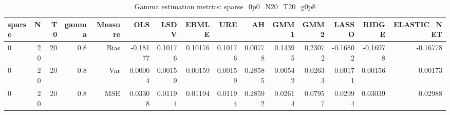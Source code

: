 \begin{table}[!htbp]\centering
\caption{Gamma estimation metrics: sparse_0p0_N20_T20_g0p8}
\label{tab:table1_sparse_0p0_N20_T20_g0p8}
\begin{tabular}{lrrrrrrrrrrrrrr}
\hline
sparse & N & T0 & gamma & Measure & OLS & LSDV & EBMLE & URE & AH & GMM1 & GMM2 & LASSO & RIDGE & ELASTIC_NET \\
\hline
0 & 20 & 20 & 0.8 & Bias & -0.18177 & 0.10176 & 0.10176 & 0.10176 & 0.00778 & 0.14395 & 0.23072 & -0.16802 & -0.16978 & -0.16778 \\
0 & 20 & 20 & 0.8 & Var & 0.00004 & 0.00159 & 0.00159 & 0.00159 & 0.28585 & 0.00542 & 0.02633 & 0.00171 & 0.00156 & 0.00173 \\
0 & 20 & 20 & 0.8 & MSE & 0.03308 & 0.01194 & 0.01194 & 0.01194 & 0.28592 & 0.02614 & 0.07957 & 0.02994 & 0.03039 & 0.02988 \\
\hline
\end{tabular}
\end{table}

